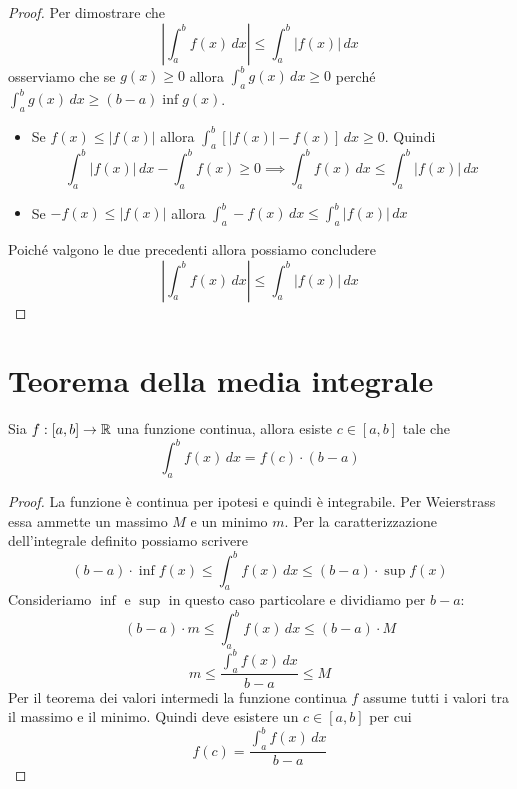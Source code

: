 \begin{proof}
Per dimostrare che
\begin{equation*}
\left\lvert \int_a^b f(x) \, dx \right\rvert \le \int_a^b |f(x)| \, dx
\end{equation*}
osserviamo che se $g(x) \ge 0$ allora $\int_a^b g(x) \, dx \ge 0$ perché $\int_a^b g(x) \, dx \ge (b-a) \inf g(x)$.

\begin{itemize}
\item Se $f(x) \le |f(x)|$ allora $\int_a^b [|f(x)| - f(x)] \, dx \ge 0$. Quindi
\begin{equation*}
\int_a^b |f(x)| \, dx - \int_a^b f(x) \ge 0 \implies \int_a^b f(x) \, dx \le \int_a^b |f(x)| \, dx
\end{equation*}
\item Se $-f(x) \le |f(x)|$ allora $\int_a^b -f(x) \, dx \le \int_a^b |f(x)| \, dx$
\end{itemize}

Poiché valgono le due precedenti allora possiamo concludere
\begin{equation*}
\left\lvert \int_a^b f(x) \, dx \right\rvert \le \int_a^b |f(x)| \, dx
\end{equation*}
\end{proof}

\section{Teorema della media integrale}

\begin{theorem}
Sia $f:[a,b] \to \mathbb R$ una funzione continua, allora esiste $c \in [a,b]$ tale che
\begin{equation*}
\int_a^b f(x) \, dx = f(c) \cdot (b-a)
\end{equation*}
\end{theorem}

\begin{proof}
La funzione è continua per ipotesi e quindi è integrabile. Per Weierstrass essa ammette un massimo $M$ e un minimo $m$.
Per la caratterizzazione dell'integrale definito possiamo scrivere
\begin{equation*}
(b-a) \cdot \inf f(x) \le \int_a^b f(x) \, dx \le (b-a) \cdot \sup f(x)
\end{equation*}
Consideriamo $\inf$ e $\sup$ in questo caso particolare e dividiamo per $b-a$:
\begin{equation*}
(b-a) \cdot m \le \int_a^b f(x) \, dx \le (b-a) \cdot M
\end{equation*}
\begin{equation*}
m \le \frac{\int_a^b f(x) \, dx}{b-a} \le M
\end{equation*}
Per il teorema dei valori intermedi la funzione continua $f$ assume tutti i valori tra il massimo e il minimo. Quindi deve esistere un $c \in [a,b]$ per cui
\begin{equation*}
f(c) = \frac{\int_a^b f(x) \, dx}{b-a}
\end{equation*}
\end{proof}

